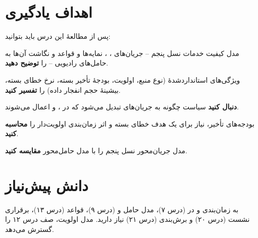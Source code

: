 \documentclass[11pt,a4paper]{article}
\begin{document}
\ACNcover

\section{اهداف یادگیری}
پس از مطالعهٔ این درس باید بتوانید:
\begin{objectives}
  \item مدل کیفیت خدمات نسل پنجم -- جریان‌های ، ، نمایه‌ها و قواعد  و نگاشت آن‌ها به حامل‌های رادیویی -- را
        \textbf{توضیح دهید}.
  \item ویژگی‌های استانداردشدهٔ  (نوع منبع، اولویت، بودجهٔ تأخیر بسته، نرخ خطای بسته، بیشینهٔ حجم انفجار داده) را
        \textbf{تفسیر کنید}.
  \item \textbf{دنبال کنید} سیاست  چگونه به جریان‌های  تبدیل می‌شود که در ،  و  اعمال
        می‌شوند.
  \item بودجه‌های تأخیر، نیاز  برای یک هدف خطای بسته و اثر زمان‌بندی اولویت‌دار را \textbf{محاسبه کنید}.
  \item مدل جریان‌محور نسل پنجم را با مدل حامل‌محور  \textbf{مقایسه کنید}.
\end{objectives}

\section{دانش پیش‌نیاز}
به زمان‌بندی و  در  (درس ۷)، مدل حامل  و  (درس ۹)، قواعد  (درس ۱۳)، برقراری نشست
 (درس ۲۰) و برش‌بندی (درس ۲۱) نیاز دارید. مدل اولویت، صف  درس ۱۲ را گسترش می‌دهد.
\end{document}
